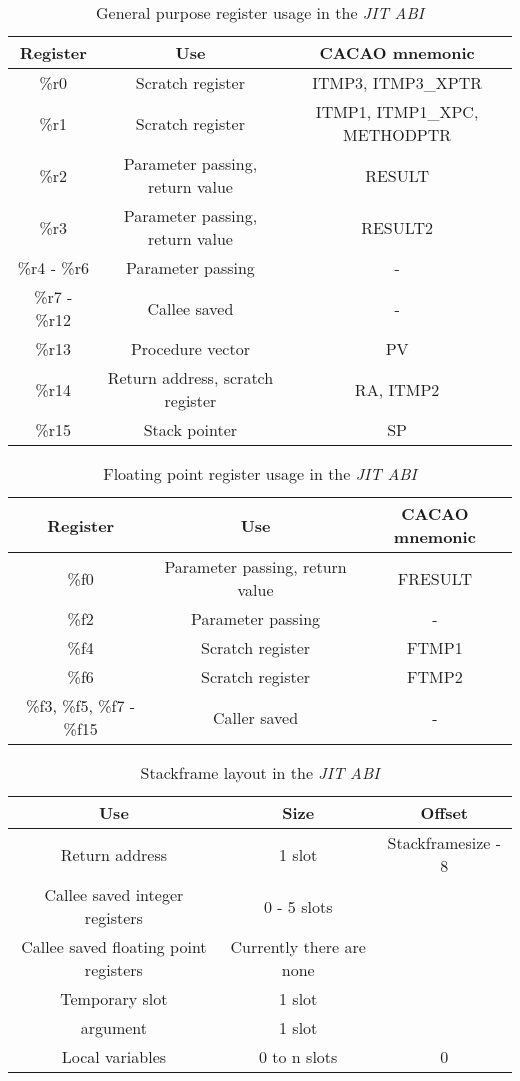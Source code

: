 \begin{table}[H]
	\centering
	\begin{tabular}{|c|c|c|}
	\hline
	Register & Use & CACAO mnemonic \\
	\hline
	\%r0 & Scratch register & ITMP3, ITMP3\_XPTR \\
	\%r1 & Scratch register & ITMP1, ITMP1\_XPC, METHODPTR \\
	\%r2 & Parameter passing, return value & RESULT \\
	\%r3 & Parameter passing, return value & RESULT2 \\
	\%r4 - \%r6 & Parameter passing & - \\
	\%r7 - \%r12 & Callee saved & - \\
	\%r13 & Procedure vector & PV \\
	\%r14 & Return address, scratch register & RA, ITMP2 \\
	\%r15 & Stack pointer & SP \\
	\hline
	\end{tabular}
	\caption{General purpose register usage in the \emph{JIT ABI}}
	\label{s390:tbl:jit:intreg}
\end{table}

\begin{table}[H]
	\centering
	\begin{tabular}{|c|c|c|}
	\hline
	Register & Use & CACAO mnemonic \\
	\hline
	\%f0 & Parameter passing, return value & FRESULT \\
	\%f2 & Parameter passing & - \\
	\%f4 & Scratch register & FTMP1 \\
	\%f6 & Scratch register & FTMP2 \\
	\%f3, \%f5, \%f7 - \%f15 & Caller saved & - \\
	\hline
	\end{tabular}
	\caption{Floating point register usage in the \emph{JIT ABI}}
	\label{s390:tbl:jit:fpreg}
\end{table}

\begin{table}[H]
	\centering
	\begin{tabular}{|c|c|c|}
	\hline
	Use & Size & Offset \\
	\hline
	Return address & 1 slot & Stackframesize - 8 \\
	Callee saved integer registers & 0 - 5 slots & \\
	Callee saved floating point registers & Currently there are none & \\
	Temporary slot & 1 slot & \\
	\code{monitorenter} argument & 1 slot & \\
	Local variables & 0 to n slots & 0 \\
	\hline
	\end{tabular}
	\caption{Stackframe layout in the \emph{JIT ABI}}
	\label{s390:tbl:jit:stack}
\end{table}

